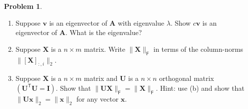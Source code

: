 \documentclass[12pt]{article}
\theoremstyle{definition}
\newtheorem{problem}{Problem}
\renewcommand{\vec}{\mathbf}
\newcommand{\T}{\mathsf{T}}
\newcommand{\F}{\mathsf{F}}
\begin{document}
\begin{problem}
    \begin{enumerate}
        \item Suppose $\vec{v}$ is an eigenvector of $\vec{A}$ with eigenvalue $\lambda$. Show $c\vec{v}$ is an eigenvector of $\vec{A}$. What is the eigenvalue?
        \item Suppose $\vec{X}$ is a $n\times m$ matrix. 
            Write $\|\vec{X}\|_\F$ in terms of the column-norms $\|[\vec{X}]_{:,i}\|_2$.
        \item Suppose $\vec{X}$ is a $n\times m$ matrix and $\vec{U}$ is a $n\times n$ orthogonal matrix $(\vec{U}^\T \vec{U} = \vec{I})$.
            Show that $\|\vec{U} \vec{X}\|_\F = \| \vec{X} \|_\F$. 
            Hint: use (b) and show that $\|\vec{U} \vec{x}\|_2 = \|\vec{x}\|_2$ for any vector $\vec{x}$.


    \end{enumerate}
\end{problem}
\end{document}
